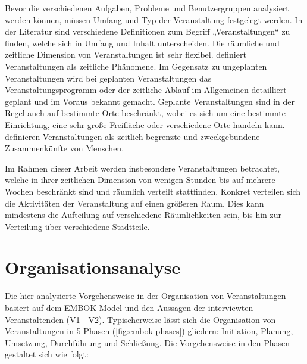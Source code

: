 Bevor die verschiedenen Aufgaben, Probleme und Benutzergruppen analysiert werden
können, müssen Umfang und Typ der Veranstaltung festgelegt werden. In der
Literatur sind verschiedene Definitionen zum Begriff „Veranstaltungen“ zu
finden, welche sich in Umfang und Inhalt unterscheiden. Die räumliche und
zeitliche Dimension von Veranstaltungen ist sehr flexibel. \textcite{Getz2007}
definiert Veranstaltungen als zeitliche Phänomene. Im Gegensatz zu ungeplanten
Veranstaltungen wird bei geplanten Veranstaltungen das Veranstaltungsprogramm
oder der zeitliche Ablauf im Allgemeinen detailliert geplant und im Voraus
bekannt gemacht. Geplante Veranstaltungen sind in der Regel auch auf bestimmte
Orte beschränkt, wobei es sich um eine bestimmte Einrichtung, eine sehr große
Freifläche oder verschiedene Orte handeln kann. \textcite{Bladen2012} definieren
Veranstaltungen als zeitlich begrenzte und zweckgebundene Zusammenkünfte von
Menschen.

Im Rahmen dieser Arbeit werden insbesondere Veranstaltungen betrachtet, welche
in ihrer zeitlichen Dimension von wenigen Stunden bis auf mehrere Wochen
beschränkt sind und räumlich verteilt stattfinden. Konkret verteilen sich die
Aktivitäten der Veranstaltung auf einen größeren Raum. Dies kann mindestens die
Aufteilung auf verschiedene Räumlichkeiten sein, bis hin zur Verteilung über
verschiedene Stadtteile.


\section{Organisationsanalyse} \label{sec:analysis-org}

Die hier analysierte Vorgehensweise in der Organisation von Veranstaltungen
basiert auf dem EMBOK-Model \cite{Silvers2013} und den Aussagen der interviewten
Veranstaltenden (V1 - V2). Typischerweise lässt sich die Organisation von
Veranstaltungen in 5 Phasen (\autoref{fig:embok-phases}) gliedern: Initiation,
Planung, Umsetzung, Durchführung und Schließung. Die Vorgehensweise in den
Phasen gestaltet sich wie folgt:

